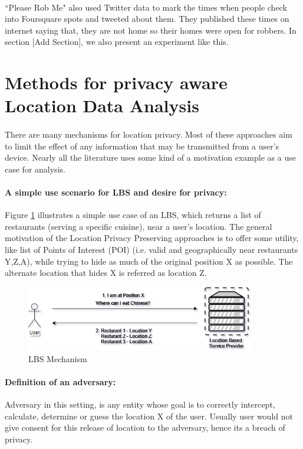 \documentclass[12pt]{report}
\begin{document}
\paragraph{}
``Please Rob Me"\cite{PleaseRobMe} also used Twitter data to mark the times when people check into Foursquare\cite{Foursquare} spots and tweeted about them. They published these times on internet saying that, they are not home so their homes were open for robbers. In section [Add Section], we also present an experiment like this.

\section{Methods for privacy aware Location Data Analysis}
\paragraph{}
There are many mechanisms for location privacy. Most of these approaches aim to limit the effect of any information that may be transmitted from a user's device. Nearly all the literature uses some kind of a motivation example as a use case for analysis.
\paragraph{A simple use scenario for LBS and desire for privacy:}

Figure \ref{fig:LBSMechanism} illustrates a simple use case of an LBS, which returns a list of restaurants (serving a specific cuisine), near a user's location. The general motivation of the Location Privacy Preserving approaches is to offer some utility, like list of Points of Interest (POI) (i.e. valid and geographically near restaurants Y,Z,A), while trying to hide as much of the original position X as possible. The alternate location that hides X is referred as location Z.
\begin{figure}[ht]
\centering
        \includegraphics[width=100mm,scale=0.5]{Images/LBS-Scenario.png}
    \caption{LBS Mechanism}
    \label{fig:LBSMechanism}
\end{figure}

\paragraph{Definition of an adversary:}
Adversary in this setting, is any entity whose goal is to correctly intercept, calculate, determine or guess the location X of the user. Usually user would not give consent for this release of location to the adversary, hence its a breach of privacy.
\end{document}
